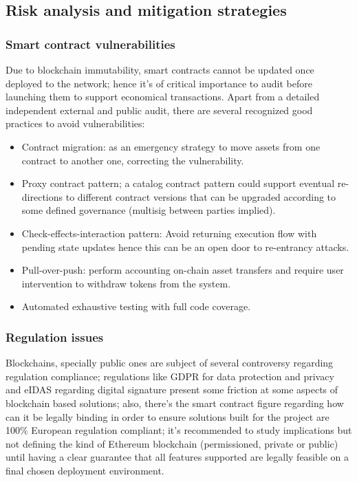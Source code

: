 \documentclass[12pt]{amsart}
\begin{document}
\begin{multicols}{2}


\subsection{Risk analysis and mitigation strategies}

\subsubsection{Smart contract vulnerabilities}

Due to blockchain immutability, smart contracts cannot be updated once
deployed to the network; hence it's of critical importance to audit
before launching them to support economical transactions. Apart from
a detailed independent external and public audit,
there are several recognized good practices to avoid
vulnerabilities:

\begin{itemize}
\item Contract migration: as an emergency strategy to move assets from
one contract to another one, correcting the vulnerability.
\item Proxy contract pattern; a catalog contract pattern could support eventual
re-directions to different contract versions that can be upgraded
according to some defined governance (multisig between parties implied).
\item Check-effects-interaction pattern: Avoid returning execution flow
with pending state updates hence this can be an open door
to re-entrancy attacks.
\item Pull-over-push: perform accounting on-chain asset transfers and require
user intervention to withdraw tokens from the system.
\item Automated exhaustive testing with full code coverage.
\end{itemize}


\subsubsection{Regulation issues}

Blockchains, specially public ones are subject of several controversy
regarding regulation compliance; regulations like GDPR for data protection
and privacy and eIDAS regarding digital signature present some friction
at some aspects of blockchain based solutions; also, there's the
smart contract figure regarding how can it be legally binding
in order to ensure solutions built
for the project are 100\% European regulation compliant;
it's recommended to study implications but not
defining the kind of Ethereum blockchain (permissioned, private or public)
until having a clear guarantee that all features supported are legally
feasible on a final chosen deployment environment.


\end{multicols}
\end{document}
